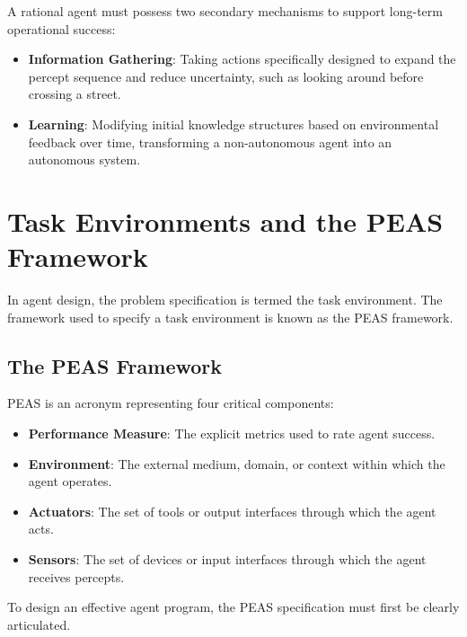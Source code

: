 \documentclass[12pt]{report}
\begin{document}
A rational agent must possess two secondary mechanisms to support long-term operational success:
\begin{itemize}
    \item \textbf{Information Gathering}: Taking actions specifically designed to expand the percept sequence and reduce uncertainty, such as looking around before crossing a street.
    \item \textbf{Learning}: Modifying initial knowledge structures based on environmental feedback over time, transforming a non-autonomous agent into an autonomous system.
\end{itemize}

\section{Task Environments and the PEAS Framework}

In agent design, the problem specification is termed the task environment. The framework used to specify a task environment is known as the PEAS framework.

\subsection{The PEAS Framework}

PEAS is an acronym representing four critical components:
\begin{itemize}
    \item \textbf{Performance Measure}: The explicit metrics used to rate agent success.
    \item \textbf{Environment}: The external medium, domain, or context within which the agent operates.
    \item \textbf{Actuators}: The set of tools or output interfaces through which the agent acts.
    \item \textbf{Sensors}: The set of devices or input interfaces through which the agent receives percepts.
\end{itemize}

To design an effective agent program, the PEAS specification must first be clearly articulated.
\end{document}
